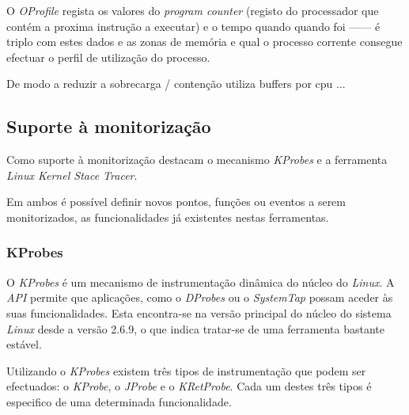 O \textit{OProfile} regista os valores do \textit{program counter} (registo do processador que contém a proxima instrução a executar) e o tempo quando quando foi  ------ é triplo com estes dados e as zonas de memória e qual o processo corrente consegue efectuar o perfil de utilização do processo.

De modo a reduzir a sobrecarga / contenção utiliza buffers por cpu ... 



\subsection{Suporte à monitorização}

Como suporte à monitorização destacam o mecanismo \textit{KProbes} e a ferramenta \textit{Linux Kernel Stace Tracer}.

Em \todo{} ambos é possível definir novos pontos, funções ou eventos a serem monitorizados, as funcionalidades já existentes nestas ferramentas.

\subsubsection{KProbes}\label{sect:KProbes_overview}

O \textit{KProbes} é um mecanismo de instrumentação dinâmica do núcleo do \textit{Linux}.
A \textit{API} permite que aplicações, como o \textit{DProbes} ou o \textit{SystemTap} possam aceder às suas funcionalidades.
Esta encontra-se na versão principal do núcleo do sistema \textit{Linux} desde a versão 2.6.9, o que indica tratar-se de uma ferramenta bastante estável\cite{kernel_debug_printk_on_fly,KProbesSite}.

Utilizando o \textit{KProbes} existem três tipos de instrumentação que podem ser efectuados: o \textit{KProbe}, o \textit{JProbe} e o \textit{KRetProbe}.
Cada um destes três tipos é especifico de uma determinada funcionalidade.

